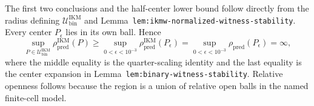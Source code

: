 The first two conclusions and the half-center lower bound follow directly from the radius defining \(\mathcal U_{\mathrm{bin}}^{\mathrm{IKM}}\) and Lemma~\texttt{lem:ikmw-normalized-witness-stability}. Every center \(P_\epsilon\) lies in its own ball. Hence
\[
 \sup_{P\in\mathcal U_{\mathrm{bin}}^{\mathrm{IKM}}}
 \rho_{\mathrm{pred}}^{\mathrm{IKM}}(P)
 \ge
 \sup_{0<\epsilon<10^{-3}}
 \rho_{\mathrm{pred}}^{\mathrm{IKM}}(P_\epsilon)
 =\sup_{0<\epsilon<10^{-3}}
 \rho_{\mathrm{pred}}(P_\epsilon)
 =\infty,
\]
where the middle equality is the quarter-scaling identity and the last equality is the center expansion in Lemma~\texttt{lem:binary-witness-stability}. Relative openness follows because the region is a union of relative open balls in the named finite-cell model.